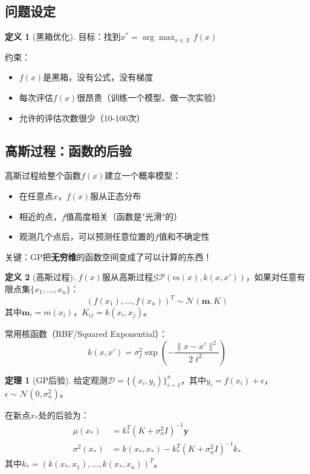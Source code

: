 \documentclass[11pt,a4paper]{article}
\theoremstyle{definition}
\newtheorem{definition}{定义}[section]
\newtheorem{theorem}{定理}[section]
\begin{document}
\subsection{问题设定}

\begin{definition}[黑箱优化]
目标：找到$x^* = \arg\max_{x \in \mathcal{X}} f(x)$

约束：
\begin{itemize}
    \item $f(x)$是黑箱，没有公式，没有梯度
    \item 每次评估$f(x)$很昂贵（训练一个模型、做一次实验）
    \item 允许的评估次数很少（10-100次）
\end{itemize}
\end{definition}

\subsection{高斯过程：函数的后验}

\begin{plainwords}[GP的直觉]
高斯过程给整个函数$f(x)$建立一个概率模型：

\begin{itemize}
    \item 在任意点$x$，$f(x)$服从正态分布
    \item 相近的点，$f$值高度相关（函数是"光滑"的）
    \item 观测几个点后，可以预测任意位置的$f$值和不确定性
\end{itemize}

关键：GP把\textbf{无穷维}的函数空间变成了可以计算的东西！
\end{plainwords}

\begin{definition}[高斯过程]
$f(x)$服从高斯过程$\mathcal{GP}(m(x), k(x,x'))$，如果对任意有限点集$\{x_1, \ldots, x_n\}$：
\[
(f(x_1), \ldots, f(x_n))^T \sim \mathcal{N}(\mathbf{m}, K)
\]
其中$\mathbf{m}_i = m(x_i)$，$K_{ij} = k(x_i, x_j)$。

常用核函数（RBF/Squared Exponential）：
\[
k(x, x') = \sigma_f^2 \exp\left(-\frac{\|x - x'\|^2}{2\ell^2}\right)
\]
\end{definition}

\begin{theorem}[GP后验]
给定观测$\mathcal{D} = \{(x_i, y_i)\}_{i=1}^n$，其中$y_i = f(x_i) + \epsilon$，$\epsilon \sim \mathcal{N}(0, \sigma_n^2)$。

在新点$x_*$处的后验为：
\begin{align*}
\mu(x_*) &= k_*^T (K + \sigma_n^2 I)^{-1} \mathbf{y} \\
\sigma^2(x_*) &= k(x_*, x_*) - k_*^T (K + \sigma_n^2 I)^{-1} k_*
\end{align*}
其中$k_* = (k(x_*, x_1), \ldots, k(x_*, x_n))^T$。
\end{theorem}
\end{document}
